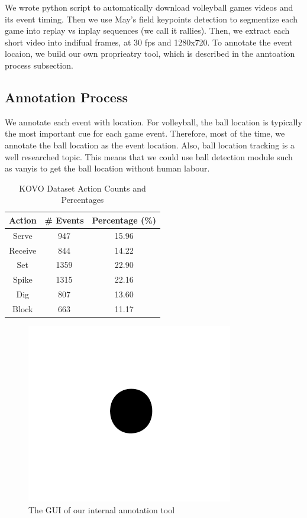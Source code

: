 \documentclass[conference]{IEEEtran}
\begin{document}
We wrote python script to automatically download volleyball games videos and its event timing.
Then we use May's field keypoints detection \cite{10312494} to segmentize each game into replay vs inplay sequences (we call it rallies). Then, we extract each short video into indifual frames, at 30 fps and 1280x720. To annotate the event locaion, we build our own proprieatry tool, which is described in the anntoation process subsection.
\subsection{Annotation Process}
We annotate each event with location. For volleyball, the ball location is typically the most important cue for each game event. Therefore, most of the time, we annotate the ball location as the event location.
Also, ball location tracking is a well researched topic. This means that we could use ball detection module such as vanyis \cite{10312079} to get the ball location without human labour.
\begin{table}[htbp]
    \caption{KOVO Dataset Action Counts and Percentages}
    \begin{center}
    \begin{tabular}{|c|c|c|}
    \hline
    \textbf{Action} & \textbf{\# Events} & \textbf{Percentage (\%)} \\
    \hline
    Serve & 947 & 15.96 \\
    Receive & 844 & 14.22 \\
    Set & 1359 & 22.90 \\
    Spike & 1315 & 22.16 \\
    Dig & 807 & 13.60 \\
    Block & 663 & 11.17 \\
    \hline
    \end{tabular}
    \label{tab-kovo-stat1}
    \end{center}
    \end{table}
    


\begin{figure}[htbp]
    \centerline{\includegraphics{fig1.png}}
    \caption{The GUI of our internal annotation tool}
    \label{fig-annotate-app}
\end{figure}
\end{document}
